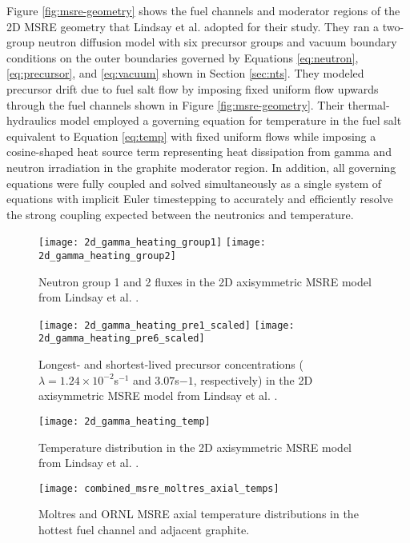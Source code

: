 Figure \ref{fig:msre-geometry} shows the fuel channels and moderator regions of
the 2D \gls{MSRE} geometry that Lindsay et al. adopted for their study.
They ran a two-group neutron diffusion model with six precursor groups and
vacuum boundary conditions on the outer boundaries governed by Equations
\ref{eq:neutron}, \ref{eq:precursor}, and \ref{eq:vacuum} shown in Section
\ref{sec:nts}. They modeled precursor drift due to fuel salt flow by imposing
fixed uniform flow upwards through the fuel channels shown in Figure
\ref{fig:msre-geometry}. Their thermal-hydraulics model employed a
governing equation for temperature in the fuel salt equivalent to Equation
\ref{eq:temp} with fixed uniform flows while imposing a cosine-shaped heat
source term representing heat dissipation from gamma and neutron irradiation in
the graphite moderator region. In addition, all governing equations were fully
coupled and solved simultaneously as a single system of equations with implicit
Euler timestepping to accurately and efficiently resolve the strong coupling
expected between the neutronics and temperature.

\begin{figure}[htb!]
	\centering
	\texttt{[image: 2d\_gamma\_heating\_group1]}
	\texttt{[image: 2d\_gamma\_heating\_group2]}
	\caption{Neutron group 1 and 2 fluxes in the 2D axisymmetric \gls{MSRE}
	model from Lindsay et al. \cite{lindsay_introduction_2018}.}
	\label{fig:msre-flux}
\end{figure}

\begin{figure}[htb!]
	\centering
	\texttt{[image: 2d\_gamma\_heating\_pre1\_scaled]}
	\texttt{[image: 2d\_gamma\_heating\_pre6\_scaled]}
	\caption{Longest- and shortest-lived precursor concentrations ($\lambda =
	1.24\times 10^{-2}$s$^{-1}$ and $3.07$s${-1}$, respectively) in the 2D
	axisymmetric \gls{MSRE} model from Lindsay et al.
	\cite{lindsay_introduction_2018}.}
	\label{fig:msre-precursor}
\end{figure}

\begin{figure}[htb!]
	\centering
	\begin{minipage}[b]{0.45\columnwidth}
	    \texttt{[image: 2d\_gamma\_heating\_temp]}
	    \caption{Temperature distribution in the 2D
	    axisymmetric \gls{MSRE} model from Lindsay et al.
	    \cite{lindsay_introduction_2018}.}
	    \label{fig:msre-temp}
	\end{minipage}
	\hfill
	\begin{minipage}[b]{0.45\columnwidth}
	    \texttt{[image: combined\_msre\_moltres\_axial\_temps]}
	    \caption{Moltres \cite{lindsay_introduction_2018} and \gls{ORNL}
	    \gls{MSRE} \cite{briggs_molten-salt_1964} axial temperature
	    distributions in the hottest fuel channel and adjacent graphite.}
	    \label{fig:msre-temp-plot}
	\end{minipage}
\end{figure}

